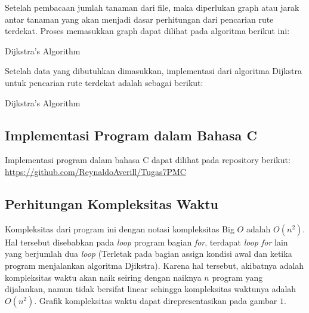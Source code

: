 \documentclass[conference]{IEEEtran}
\begin{document}
    
    Setelah pembacaan jumlah tanaman dari file, maka diperlukan
    graph atau jarak antar tanaman yang akan menjadi dasar
    perhitungan dari pencarian rute terdekat. Proses memasukkan
    graph dapat dilihat pada algoritma berikut ini:

    \begin{algorithm}
        \caption{Dijkstra's Algorithm}\label{alg:five}

        


        
    \end{algorithm}

    Setelah data yang dibutuhkan dimasukkan, implementasi
    dari algoritma Dijkstra untuk pencarian rute terdekat adalah
    sebagai berikut:

    \begin{algorithm}
        \caption{Dijkstra's Algorithm}\label{alg:six}

        

        
    \end{algorithm}
    
\subsection{Implementasi Program dalam Bahasa C}
    Implementasi program dalam bahasa C dapat dilihat
    pada repository berikut: \newline\href{https://github.com/ReynaldoAverill/Tugas7PMC}
    {https://github.com/ReynaldoAverill/Tugas7PMC}
\subsection{Perhitungan Kompleksitas Waktu}
    Kompleksitas dari program ini dengan notasi kompleksitas
    Big $O$ adalah $O(n^2)$. Hal tersebut disebabkan pada \textit{loop}
    program bagian \textit{for}, terdapat \textit{loop for} lain yang berjumlah
    dua \textit{loop} (Terletak pada bagian assign kondisi awal dan ketika
    program menjalankan algoritma Djikstra). Karena hal tersebut,
    akibatnya adalah kompleksitas waktu akan naik seiring dengan
    naiknya $n$ program yang dijalankan, namun tidak bersifat
    linear sehingga kompleksitas waktunya adalah $O(n^2)$. Grafik
    kompleksitas waktu dapat direpresentasikan pada gambar $1$.
    
\end{document}
